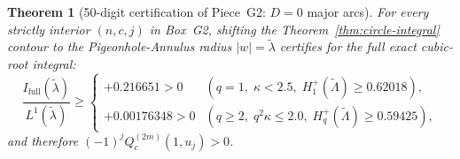 \documentclass[10pt]{article}
\numberwithin{equation}{section}
\theoremstyle{plain}
\newtheorem{theorem}{Theorem}[section]
\theoremstyle{definition}
\newcommand{\1}{\mathbf{1}}
\begin{document}
\begin{theorem}[50-digit certification of Piece~G2: $D = 0$ major arcs]\label{thm:G2}
For every strictly interior $(n, c, j)$ in Box~G2, shifting the Theorem~\ref{thm:circle-integral} contour to the Pigeonhole-Annulus radius $|w| = \tilde{\lambda}$ certifies for the full exact cubic-root integral:
\[
\frac{I_{\mathrm{full}}(\tilde{\lambda})}{L^1(\tilde{\lambda})} \ge
\begin{cases}
+0.216651 > 0 & (q = 1,\; \kappa < 2.5,\; H_1^+(\tilde{\Lambda}) \ge 0.62018), \\
+0.00176348 > 0 & (q \ge 2,\; q^2\kappa \le 2.0,\; H_q^+(\tilde{\Lambda}) \ge 0.59425),
\end{cases}
\]
and therefore $(-1)^j Q_c^{(2m)}(1, u_j) > 0$.
\end{theorem}
\end{document}
